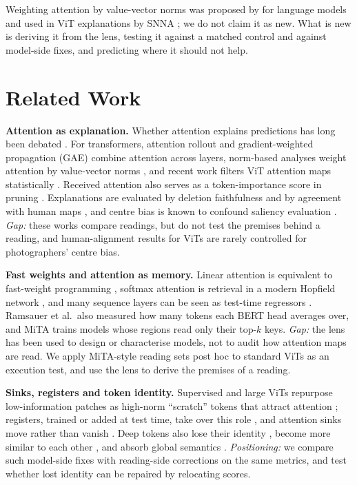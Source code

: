 \documentclass{article}
\begin{document}
Weighting attention by value-vector norms was proposed by \citet{kobayashi2020} for language models and used in ViT explanations by SNNA \citep{zhu2024}; we do not claim it as new. What is new is deriving it from the lens, testing it against a matched control and against model-side fixes, and predicting where it should not help.

\section{Related Work}

\textbf{Attention as explanation.} Whether attention explains predictions has long been debated \citep{jain2019,wiegreffe2019}. For transformers, attention rollout \citep{abnar2020} and gradient-weighted propagation (GAE) \citep{chefer2021} combine attention across layers, norm-based analyses weight attention by value-vector norms \citep{kobayashi2020,zhu2024}, and recent work filters ViT attention maps statistically \citep{ayyar2025}. Received attention also serves as a token-importance score in pruning \citep{goyal2020,kim2022}. Explanations are evaluated by deletion faithfulness \citep{bluecher2024} and by agreement with human maps \citep{fel2022}, and centre bias is known to confound saliency evaluation \citep{kuang2026}. \emph{Gap:} these works compare readings, but do not test the premises behind a reading, and human-alignment results for ViTs are rarely controlled for photographers' centre bias.

\textbf{Fast weights and attention as memory.} Linear attention is equivalent to fast-weight programming \citep{schmidhuber1992,schlag2021}, softmax attention is retrieval in a modern Hopfield network \citep{ramsauer2021}, and many sequence layers can be seen as test-time regressors \citep{wang2026}. Ramsauer et al.\ also measured how many tokens each BERT head averages over, and MiTA \citep{wen2026} trains models whose regions read only their top-$k$ keys. \emph{Gap:} the lens has been used to design or characterise models, not to audit how attention maps are read. We apply MiTA-style reading sets post hoc to standard ViTs as an execution test, and use the lens to derive the premises of a reading.

\textbf{Sinks, registers and token identity.} Supervised and large ViTs repurpose low-information patches as high-norm ``scratch'' tokens that attract attention \citep{darcet2024}; registers, trained or added at test time, take over this role \citep{darcet2024,jiang2025}, and attention sinks move rather than vanish \citep{fesser2026}. Deep tokens also lose their identity \citep{brunner2020}, become more similar to each other \citep{wang2022}, and absorb global semantics \citep{su2026}. \emph{Positioning:} we compare such model-side fixes with reading-side corrections on the same metrics, and test whether lost identity can be repaired by relocating scores.
\end{document}
